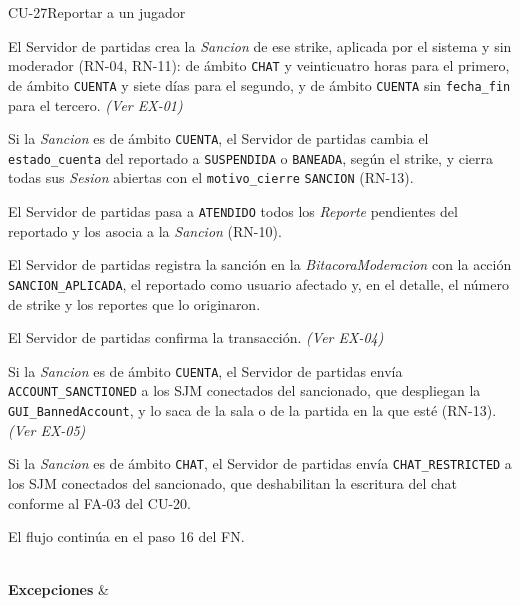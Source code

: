 \begin{fichacu}{CU-27}{Reportar a un jugador}
{\begin{cuenum}[start=1]
      \item El Servidor de partidas crea la \textit{Sancion} de ese strike, aplicada por el sistema y sin moderador (\mbox{RN-04}, \mbox{RN-11}): de ámbito \texttt{CHAT} y veinticuatro horas para el primero, de ámbito \texttt{CUENTA} y siete días para el segundo, y de ámbito \texttt{CUENTA} sin \texttt{fecha\_\allowbreak{}fin} para el tercero. \textit{(Ver \mbox{EX-01})}
      \item Si la \textit{Sancion} es de ámbito \texttt{CUENTA}, el Servidor de partidas cambia el \texttt{estado\_\allowbreak{}cuenta} del reportado a \texttt{SUSPENDIDA} o \texttt{BANEADA}, según el strike, y cierra todas sus \textit{Sesion} abiertas con el \texttt{motivo\_\allowbreak{}cierre} \texttt{SANCION} (\mbox{RN-13}).
      \item El Servidor de partidas pasa a \texttt{ATENDIDO} todos los \textit{Reporte} pendientes del reportado y los asocia a la \textit{Sancion} (\mbox{RN-10}).
      \item El Servidor de partidas registra la sanción en la \textit{BitacoraModeracion} con la acción \texttt{SANCION\_\allowbreak{}APLICADA}, el reportado como usuario afectado y, en el detalle, el número de strike y los reportes que lo originaron.
      \item El Servidor de partidas confirma la transacción. \textit{(Ver \mbox{EX-04})}
      \item Si la \textit{Sancion} es de ámbito \texttt{CUENTA}, el Servidor de partidas envía \texttt{ACCOUNT\_\allowbreak{}SANCTIONED} a los SJM conectados del sancionado, que despliegan la \texttt{GUI\_\allowbreak{}BannedAccount}, y lo saca de la sala o de la partida en la que esté (\mbox{RN-13}). \textit{(Ver \mbox{EX-05})}
      \item Si la \textit{Sancion} es de ámbito \texttt{CHAT}, el Servidor de partidas envía \texttt{CHAT\_\allowbreak{}RESTRICTED} a los SJM conectados del sancionado, que deshabilitan la escritura del chat conforme al \mbox{FA-03} del \mbox{CU-20}.
      \item El flujo continúa en el paso 16 del FN.
    \end{cuenum}} \\ \hline
  \textbf{Excepciones} & 
\end{fichacu}
